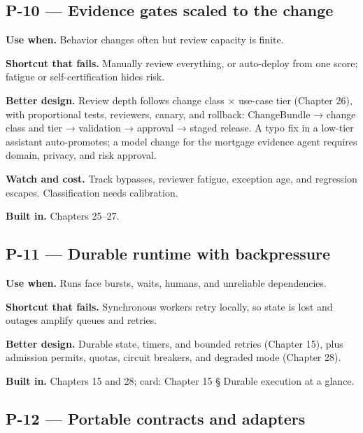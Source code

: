 \subsection{P-10 — Evidence gates scaled to the change}

\textbf{Use when.} Behavior changes often but review capacity is finite.\par

\textbf{Shortcut that fails.} Manually review everything, or auto-deploy from one score; fatigue or self-certification hides risk.\par

\textbf{Better design.} Review depth follows change class × use-case tier (Chapter 26), with proportional tests, reviewers, canary, and rollback: ChangeBundle → change class and tier → validation → approval → staged release. A typo fix in a low-tier assistant auto-promotes; a model change for the mortgage evidence agent requires domain, privacy, and risk approval.\par

\textbf{Watch and cost.} Track bypasses, reviewer fatigue, exception age, and regression escapes. Classification needs calibration.\par

\textbf{Built in.} Chapters 25–27.\par

\subsection{P-11 — Durable runtime with backpressure}

\textbf{Use when.} Runs face bursts, waits, humans, and unreliable dependencies.\par

\textbf{Shortcut that fails.} Synchronous workers retry locally, so state is lost and outages amplify queues and retries.\par

\textbf{Better design.} Durable state, timers, and bounded retries (Chapter 15), plus admission permits, quotas, circuit breakers, and degraded mode (Chapter 28).\par

\textbf{Built in.} Chapters 15 and 28; card: Chapter 15 § Durable execution at a glance.\par

\subsection{P-12 — Portable contracts and adapters}

